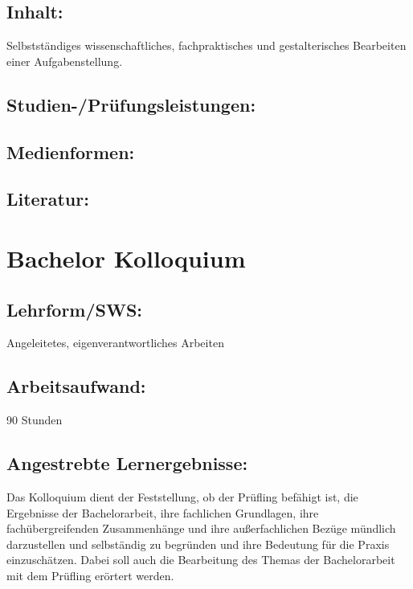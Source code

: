 \section{Inhalt:}\label{inhalt-3}

Selbstständiges wissenschaftliches, fachpraktisches und gestalterisches
Bearbeiten einer Aufgabenstellung.

\section{Studien-/Prüfungsleistungen:}\label{studien-pruxfcfungsleistungen-3}

\section{Medienformen:}\label{medienformen-3}

\section{Literatur:}\label{literatur-3}

\chapter{Bachelor Kolloquium}\label{bachelor-kolloquium}

\section{Lehrform/SWS:}\label{lehrformsws-4}

Angeleitetes, eigenverantwortliches Arbeiten

\section{Arbeitsaufwand:}\label{arbeitsaufwand-4}

90 Stunden

\section{Angestrebte
Lernergebnisse:}\label{angestrebte-lernergebnisse-4}

Das Kolloquium dient der Feststellung, ob der Prüfling befähigt ist, die
Ergebnisse der Bachelorarbeit, ihre fachlichen Grundlagen, ihre
fachübergreifenden Zusammenhänge und ihre außerfachlichen Bezüge
mündlich darzustellen und selbständig zu begründen und ihre Bedeutung
für die Praxis einzuschätzen. Dabei soll auch die Bearbeitung des Themas
der Bachelorarbeit mit dem Prüfling erörtert werden.


